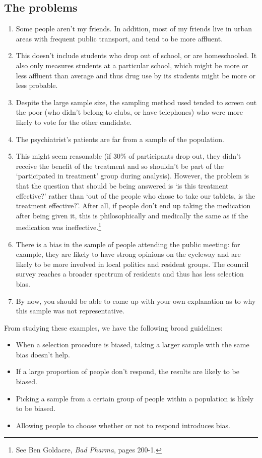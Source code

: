 \subsection*{The problems}
\begin{enumerate}
  \item Some people aren't my friends. In addition, most of my friends live in urban areas with frequent public transport,
        and tend to be more affluent.
  \item This doesn't include students who drop out of school, or are homeschooled. It also only measures students at
        a particular school, which might be more or less affluent than average and thus drug use by its students might be more or less
        probable.
  \item Despite the large sample size, the sampling method used tended to screen out the poor (who didn't belong to clubs, or
        have telephones) who were more likely to vote for the other candidate.
  \item The psychiatrist's patients are far from a sample of the population.
  \item This might seem reasonable (if 30\% of participants drop out, they didn't receive the benefit of the treatment and so
        shouldn't be part of the `participated in treatment' group during analysis). However, the problem is that the question
        that should be being answered is `is this treatment effective?' rather than `out of the people who chose to take our
        tablets, is the treatment effective?'. After all, if people don't end up taking the medication after being given it,
        this is philosophically and medically the same as if the medication was ineffective.\footnote{See Ben Goldacre, \emph{Bad Pharma}, pages 200-1.}
  \item There is a bias in the sample of people attending the public meeting: for example, they are likely to have strong opinions on the cycleway and
        are likely to be more involved in local politics and resident groups. The council survey reaches a broader spectrum of residents and thus
        has less selection bias.
  \item By now, you should be able to come up with your own explanation as to why this sample was not representative.
\end{enumerate}

From studying these examples, we have the following broad guidelines:
\begin{itemize}
  \item When a selection procedure is biased, taking a larger sample with the same bias doesn't help.
  \item If a large proportion of people don't respond, the results are likely to be biased.
  \item Picking a sample from a certain group of people within a population is likely to be biased.
  \item Allowing people to choose whether or not to respond introduces bias.
\end{itemize}

